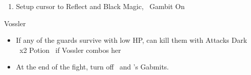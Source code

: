 \begin{enumerate}
	\item Setup cursor to Reflect and Black Magic, \penelo\ Gambit On
\end{enumerate}
\begin{battle}{Vossler}
	\begin{itemize}
		\ashef Aero Imperial Swordsman C (the middle one)
		\vaanf Reflect \vaan
		\penelof Reflect Ashe
		\ashef Gambit On
		\item If any of the guards survive with low HP, can kill them with Attacks
		\vaanf Dark \vaan\ x2
		\vaan Potion \ashe\ if Vossler combos her
		\item At the end of the fight, turn off \ashe\ and \penelo's Gabmits.
	\end{itemize}
\end{battle}